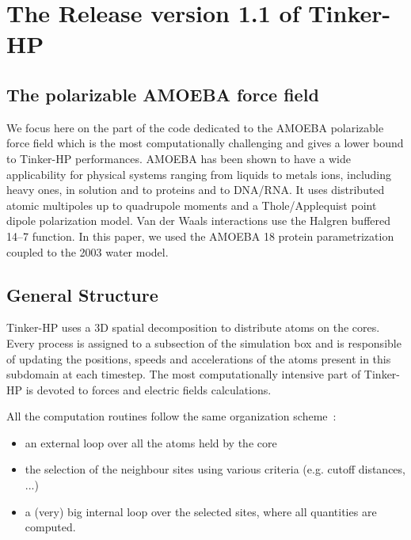 \documentclass[9pt,comparison]{livecoms}
\begin{document}
\section{The Release version 1.1 of Tinker-HP}
\subsection{The polarizable AMOEBA force field}
\hspace{\parindent}We focus here on the part of the code dedicated to the AMOEBA polarizable force field which is the most computationally challenging and gives a lower bound to Tinker-HP performances\cite{ren2003polarizable,Ponder2007CurrentField}.
AMOEBA has been shown to have a wide applicability for physical systems ranging from liquids to metals ions,\cite{Amber9AMOEBA,wu2010polarizable} including heavy ones,\cite{Marjolin2012,Marjolin2014} in solution and to proteins \cite{shi2013polarizable,zhang2018amoeba} and to DNA/RNA\cite{zhang2018amoeba}. It uses distributed atomic multipoles up to quadrupole moments and a Thole/Applequist point dipole polarization model. Van der Waals interactions use the Halgren buffered 14–7 function. In this paper, we used the AMOEBA 18 protein parametrization \cite{shi2013polarizable,zhang2018amoeba} coupled to the 2003 water model\cite{ren2003polarizable}.
\subsection{General Structure}
\hspace{\parindent}Tinker-HP uses a 3D spatial decomposition to distribute atoms on the cores. Every process is assigned to a subsection of the simulation box and is responsible of updating the positions, speeds and accelerations of the atoms present in this subdomain at each timestep\cite{Tinker-HP}. The most computationally intensive part of Tinker-HP is devoted to forces and electric fields calculations. 

All the computation routines follow the same organization scheme~:
\begin{itemize}
    \item an external loop over all the atoms held by the core
    \item the selection of the neighbour sites using various criteria (e.g. cutoff distances, ...)
    \item a (very) big internal loop over the selected sites, where all quantities are computed.
\end{itemize}
\end{document}
